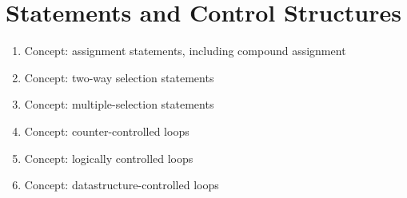 \section{Statements and Control Structures}\label{sec:Statements_Control_Structures}

\begin{enumerate}[noitemsep]
\item Concept: assignment statements, including compound assignment
\item Concept: two-way selection statements
\item Concept: multiple-selection statements
\item Concept: counter-controlled loops
\item Concept: logically controlled loops
\item Concept: datastructure-controlled loops
\end{enumerate}


